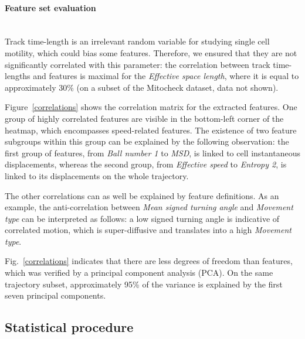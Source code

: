 \paragraph{Feature set evaluation}~\\
Track time-length is an irrelevant random variable for studying single cell motility, which could bias some features. Therefore, we ensured that they are not significantly correlated with this parameter: the correlation between track time-lengths and features is maximal for the \textit{Effective space length}, where it is equal to approximately $30\%$ (on a subset of the Mitocheck dataset, data not shown).

Figure~\ref{correlations} shows the correlation matrix for the
extracted features. 
One group of highly correlated features are visible in the bottom-left
corner of the heatmap, which encompasses speed-related features. The
existence of two feature subgroups within this group can be explained
by the following observation: the first group of features, from
\textit{Ball number 1} to \textit{MSD}, is linked to cell
instantaneous displacements, whereas the second group, from
\textit{Effective speed} to \textit{Entropy 2}, is linked to its
displacements on the whole trajectory.  

The other correlations can as well be explained by feature definitions. As an example, the anti-correlation between \textit{Mean signed turning angle} and \textit{Movement type} can be interpreted as follows: a low signed turning angle is indicative of correlated motion, which is super-diffusive and translates into a high \textit{Movement type}.

Fig.~\ref{correlations} indicates that there are less degrees of
freedom than features, which was verified by a principal component
analysis (PCA). On the same trajectory subset, approximately 95\% of
the variance is explained by the first seven principal components. 

\subsection{Statistical procedure}
\label{sec:stats}
